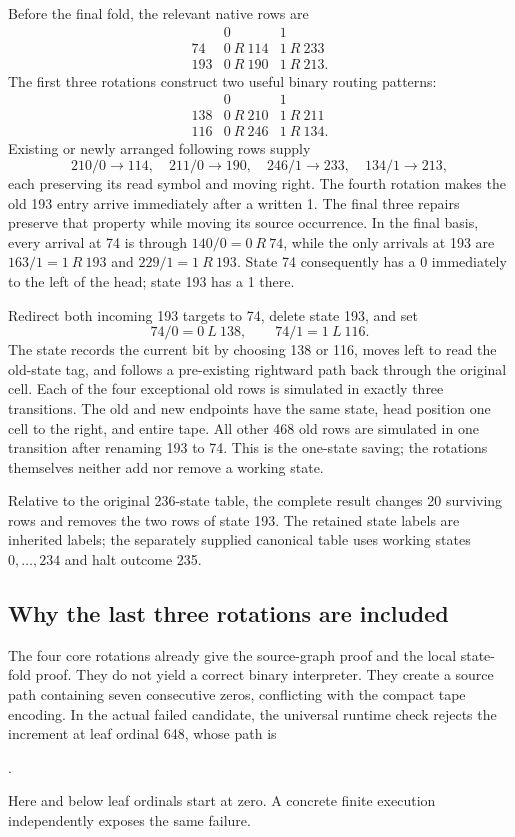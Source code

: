 Before the final fold, the relevant native rows are
\[
\begin{array}{c|cc}
 &0&1\\\hline
 74&0\ R\ 114&1\ R\ 233\\
 193&0\ R\ 190&1\ R\ 213.
\end{array}
\]
The first three rotations construct two useful binary routing patterns:
\[
\begin{array}{c|cc}
 &0&1\\\hline
 138&0\ R\ 210&1\ R\ 211\\
 116&0\ R\ 246&1\ R\ 134.
\end{array}
\]
Existing or newly arranged following rows supply
\[
 210/0\to114,\quad211/0\to190,\quad
 246/1\to233,\quad134/1\to213,
\]
each preserving its read symbol and moving right.  The fourth rotation
makes the old 193 entry arrive immediately after a written 1.  The final
three repairs preserve that property while moving its source occurrence.
In the final basis, every arrival at 74 is through $140/0=0\ R\ 74$,
while the only arrivals at 193 are $163/1=1\ R\ 193$ and
$229/1=1\ R\ 193$.  State 74 consequently has a 0 immediately to the
left of the head; state 193 has a 1 there.

Redirect both incoming 193 targets to 74, delete state 193, and set
\[
 74/0=0\ L\ 138,\qquad 74/1=1\ L\ 116.
\]
The state records the current bit by choosing 138 or 116, moves left to
read the old-state tag, and follows a pre-existing rightward path back
through the original cell.  Each of the four exceptional old rows is
simulated in exactly three transitions.  The old and new endpoints have
the same state, head position one cell to the right, and entire tape.
All other 468 old rows are simulated in one transition after renaming
193 to 74.  This is the one-state saving; the rotations themselves
neither add nor remove a working state.

Relative to the original 236-state table, the complete result changes
20 surviving rows and removes the two rows of state 193.  The retained
state labels are inherited labels; the separately supplied canonical
table uses working states $0,\ldots,234$ and halt outcome 235.

\subsection{Why the last three rotations are included}

The four core rotations already give the source-graph proof and the
local state-fold proof.  They do not yield a correct binary interpreter.
They create a source path containing seven consecutive zeros, conflicting
with the compact tape encoding.  In the actual failed candidate, the
universal runtime check rejects the increment at leaf ordinal 648,
whose path is
\begin{center}.
\end{center}
Here and below leaf ordinals start at zero.  A concrete finite execution
independently exposes the same failure.

